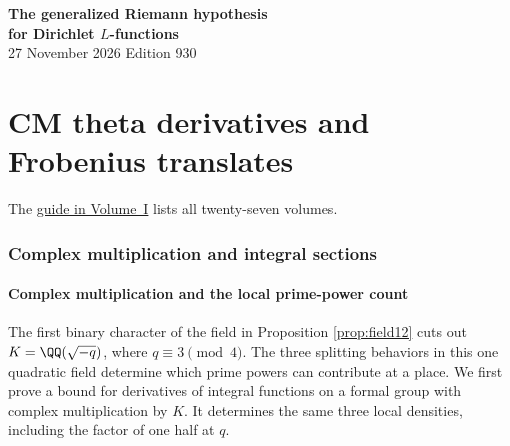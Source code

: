 \documentclass[a4paper,11pt]{article}
\theoremstyle{definition}
\theoremstyle{remark}
\numberwithin{equation}{section}
\begin{document}
\setcounter{part}{12}
\thispagestyle{plain}\begin{center}
{\LARGE\bfseries The generalized Riemann hypothesis\\[2pt]for Dirichlet \(L\)-functions}\\[6pt]
{\small 27 November 2026 \quad\textperiodcentered\quad Edition 930}\end{center}
\part{CM theta derivatives and Frobenius translates}\label{part:XIII}
\begin{abstract}\noindent We construct the CM theta derivatives, compute local divisibility and follow Frobenius through the prescribed rows. Interpolation at split primes gives integral and archimedean estimates for the marked elliptic jets.\end{abstract}
\setcounter{section}{63}
\noindent The \hyperref[seriesguide]{guide in Volume~I} lists all twenty-seven volumes.
\begingroup\small\setlength{\parskip}{0pt}\tableofcontents\endgroup
\clearpage

\section{Complex multiplication and integral sections}\label{nav:g-V-0}\label{nav:volume-XIII}

\subsection{Complex multiplication and the local prime-power count}\label{nav:V-00}
\label{sec:cm37}

The first binary character of the field in Proposition \ref{prop:field12} cuts out \(K=\QQ(\sqrt{-q})\), where \(q\equiv3\pmod4\). The three splitting behaviors in this one quadratic field determine which prime powers can contribute at a place. We first prove a bound for derivatives of integral functions on a formal group with complex multiplication by \(K\). It determines the same three local densities, including the factor of one half at \(q\).
\end{document}
